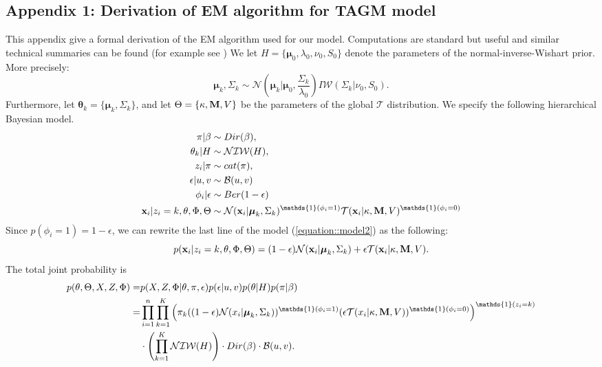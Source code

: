 \documentclass[12pt,english]{article}
\begin{document}
\subsection{Appendix 1: Derivation of EM algorithm for TAGM model}\label{apd:EMderv}
This appendix give a formal derivation of the EM algorithm used for our model. Computations are standard but useful and similar
technical summaries can be found (for example see \cite{Fraley:2005, Murphy:2007})
We let $H = \{\boldsymbol{\mu}_0, \lambda_0, \nu_0, S_0\}$ denote the parameters of the normal-inverse-Wishart prior. More precisely:
\begin{equation} \label{equation::prior}
\boldsymbol{\mu}_k, \Sigma_k\sim \mathcal{N}\left(\boldsymbol{\mu}_k|\boldsymbol{\mu}_0, \frac{\Sigma_{k}}{\lambda_0}\right)I\mathcal{W}\left(\Sigma_{k}|\nu_0, S_0\right).
\end{equation}
Furthermore, let $\boldsymbol{\theta}_k = \{\boldsymbol{\mu}_k, \Sigma_{k}\}$, and let $\Theta = \{\kappa, {\bf M},V\}$ be the parameters of the global $\mathcal{T}$ distribution. We specify the following hierarchical Bayesian model.
\begin{equation}\label{equation::model2}
\begin{split}
\pi|\beta &\sim Dir(\beta),\\
\theta_k|H &\sim \mathcal{NIW}(H),\\
z_i|\pi & \sim cat(\pi), \\
\epsilon|u,v & \sim \mathcal{B}(u,v)  \\
\phi_i|\epsilon & \sim Ber(1-\epsilon) \\
{\bf x}_i|z_i = k,\theta, \Phi , \Theta & \sim \mathcal{N}({\bf x}_i|\boldsymbol{\mu}_k, \Sigma_k)^{\mathds{1}(\phi_i = 1)}\mathcal{T}({\bf x}_i|\kappa, {\bf M}, V)^{\mathds{1}(\phi_i = 0)}
\end{split}
\end{equation}
Since $p(\phi_i = 1) = 1-\epsilon$, we can rewrite the last line of the model (\ref{equation::model2}) as the following:
\[p({\bf x}_i|z_i = k,\theta, \Phi , \Theta) = (1-\epsilon) \mathcal{N}({\bf x}_i|\boldsymbol{\mu}_k, \Sigma_k) + \epsilon \mathcal{T}({\bf x}_i|\kappa, {\bf M}, V).\]
The total joint probability is
\begin{equation}\label{equation::likelihood2}
\begin{split}
p(\theta,\Theta, X, Z, \Phi)  = &p(X,Z,\Phi|\theta,\pi, \epsilon)p(\epsilon|u,v)p(\theta|H)p(\pi|\beta)\\
=  & \prod_{i=1}^{n}\prod_{k=1}^{K}\left(\pi_k((1-\epsilon)\mathcal{N}(x_i|\boldsymbol{\mu}_k, \Sigma_k))^{\mathds{1}(\phi_i = 1)}(\epsilon \mathcal{T}(x_i|\kappa, {\bf M}, V))^{\mathds{1}(\phi_i = 0)}\right)^{\mathds{1}(z_i=k)}\\
&\cdot \left(\prod_{k=1}^{K}\mathcal{NIW}(H)\right)\cdot Dir(\beta)\cdot \mathcal{B}(u,v).
\end{split}
\end{equation}
\end{document}
